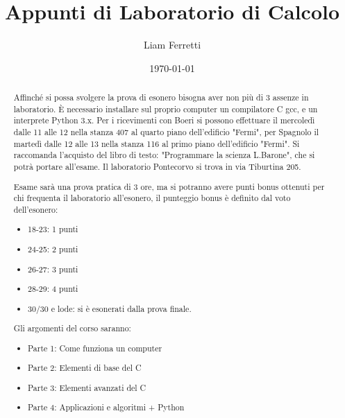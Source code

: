 \documentclass[a4paper,12pt]{article}
\title{Appunti di Laboratorio di Calcolo}
\author{Liam Ferretti}
\date{\today}
\begin{document}
	
	\maketitle
	
	\begin{abstract}
		Affinché si possa svolgere la prova di esonero bisogna aver non più di 3 assenze in laboratorio.
		È necessario installare sul proprio computer un compilatore C gcc, e un interprete Python 3.x.
		Per i ricevimenti con Boeri si possono effettuare il mercoledì dalle 11 alle 12 nella stanza 407 al quarto piano dell'edificio "Fermi", per Spagnolo il martedì dalle 12 alle 13 nella stanza 116 al primo piano dell'edificio "Fermi".
		Si raccomanda l'acquisto del libro di testo: "Programmare la scienza L.Barone", che si potrà portare all'esame.
		Il laboratorio Pontecorvo si trova in via Tiburtina 205.
		
		Esame sarà una prova pratica di 3 ore, ma si potranno avere punti bonus ottenuti per chi frequenta il laboratorio all'esonero, il punteggio bonus è definito dal voto dell'esonero:
		\begin{itemize}
			\item 18-23: 1 punti
			\item 24-25: 2 punti
			\item 26-27: 3 punti
			\item 28-29: 4 punti
			\item 30/30 e lode: si è esonerati dalla prova finale.
		\end{itemize}
		Gli argomenti del corso saranno:
		\begin{itemize}
			\item Parte 1: Come funziona un computer
			\item Parte 2: Elementi di base del C
			\item Parte 3: Elementi avanzati del C
			\item Parte 4: Applicazioni e algoritmi + Python
		\end{itemize}
	\end{abstract}
	
	\newpage
	\tableofcontents
	\clearpage
	
\end{document}
